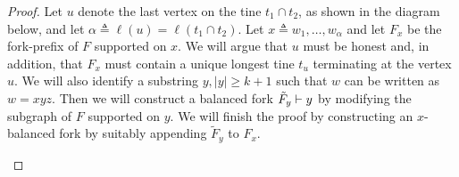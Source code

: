 \begin{proof}
  Let $u$ denote the last vertex on the tine
  $t_1 \cap t_2$, as shown in the diagram below, and let
  $\alpha \triangleq \ell(u) = \ell(t_1 \cap t_2)$. 
  Let $x \triangleq w_1, \ldots, w_\alpha$ 
  and let $F_x$ be the fork-prefix of $F$ supported on $x$. 
  We will argue that $u$ must be honest and, in addition, that 
  $F_x$ must contain a unique longest tine $t_u$ terminating 
  at the vertex $u$. 
  We will also identify a substring $y, |y| \geq k + 1$ 
  such that $w$ can be written as $w = xyz$. 
  Then we will construct a balanced fork $\tilde{F}_y \vdash y$ by 
  modifying the subgraph of $F$ supported on $y$. 
  We will finish the proof by constructing an $x$-balanced fork by 
  suitably appending $\tilde{F}_y$ to $F_x$.
    
  \begin{center}
    \end{center}


\end{proof}
